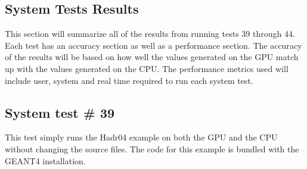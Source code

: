 \documentclass[12pt]{article}
\begin{document}
\subsection{System Tests Results}
This section will summarize all of the results from running tests 39 through 44. Each test has an accuracy section as well as a performance section. The accuracy of the results will be based on how well the values generated on the GPU match up with the values generated on the CPU. The performance metrics used will include user, system and real time required to run each  system test.

\subsection{System test \# 39}
This test simply runs the Hadr04 example on both the GPU and the CPU without changing the source files. The code for this example is bundled with the GEANT4 installation.\\
\end{document}

